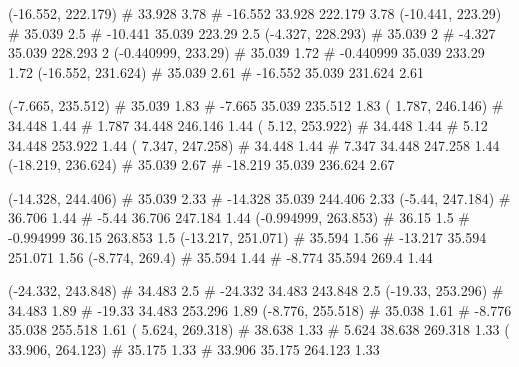 \documentclass[a4paper,openbib,10pt]{article}
\newenvironment{treegraph}{\begin{graph}}{\end{graph}}
\begin{document}
\begin{treegraph}
  (-16.552, 222.179) #     33.928    3.78
   #    -16.552    33.928    222.179    3.78
  (-10.441, 223.29) #     35.039    2.5
   #    -10.441    35.039    223.29    2.5
  (-4.327, 228.293) #     35.039    2
   #    -4.327    35.039    228.293    2
  (-0.440999, 233.29) #     35.039    1.72
   #    -0.440999    35.039    233.29    1.72
  (-16.552, 231.624) #     35.039    2.61
   #    -16.552    35.039    231.624    2.61

  (-7.665, 235.512) #     35.039    1.83
   #    -7.665    35.039    235.512    1.83
  ( 1.787, 246.146) #     34.448    1.44
   #    1.787    34.448    246.146    1.44
  ( 5.12, 253.922) #     34.448    1.44
   #    5.12    34.448    253.922    1.44
  ( 7.347, 247.258) #     34.448    1.44
   #    7.347    34.448    247.258    1.44
  (-18.219, 236.624) #     35.039    2.67
   #    -18.219    35.039    236.624    2.67

  (-14.328, 244.406) #     35.039    2.33
   #    -14.328    35.039    244.406    2.33
  (-5.44, 247.184) #     36.706    1.44
   #    -5.44    36.706    247.184    1.44
  (-0.994999, 263.853) #     36.15    1.5
   #    -0.994999    36.15    263.853    1.5
  (-13.217, 251.071) #     35.594    1.56
   #    -13.217    35.594    251.071    1.56
  (-8.774, 269.4) #     35.594    1.44
   #    -8.774    35.594    269.4    1.44

  (-24.332, 243.848) #     34.483    2.5
   #    -24.332    34.483    243.848    2.5
  (-19.33, 253.296) #     34.483    1.89
   #    -19.33    34.483    253.296    1.89
  (-8.776, 255.518) #     35.038    1.61
   #    -8.776    35.038    255.518    1.61
  ( 5.624, 269.318) #     38.638    1.33
   #    5.624    38.638    269.318    1.33
  ( 33.906, 264.123) #     35.175    1.33
   #    33.906    35.175    264.123    1.33


\end{treegraph}
\end{document}
